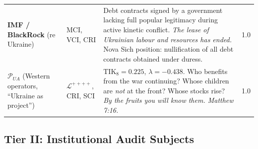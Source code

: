 \documentclass[11pt,a4paper]{article}
\theoremstyle{definition}
\theoremstyle{remark}
\newcommand{\LondonOp}{\mathcal{L}^{++++}}  %
\newcommand{\UkrProject}{\mathcal{P}_{UA}}  %
\begin{document}
\begin{longtable}{@{}p{}p{}
  p{}p{}@{}}
\textbf{IMF / BlackRock}
\newline(re Ukraine)
& MCI, VCI, CRI
& Debt contracts signed by a government
  lacking full popular legitimacy
  during active kinetic conflict.
  \textit{The lease of Ukrainian labour
  and resources has ended.}
  Nova Sich position:
  nullification of all debt contracts
  obtained under duress. &
  1.0 \\[6pt]

\textbf{$\UkrProject$}
\newline(Western operators,
``Ukraine as project'')
& $\LondonOp$, CRI, SCI
& TIK$_8 = 0.225$, $\lambda = -0.438$.
  Who benefits from the war continuing?
  Whose children are \textit{not} at the front?
  Whose stocks rise?
  \textit{By the fruits you will know them.
  Matthew 7:16.} &
  1.0 \\

\end{longtable}

\subsection{Tier II: Institutional Audit Subjects}
\label{sec:list-tier2}
\end{document}
